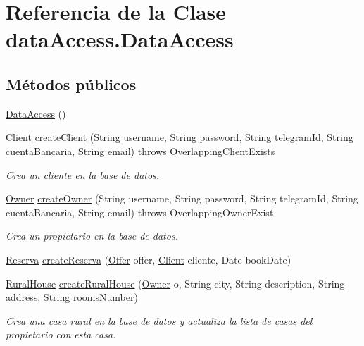 \hypertarget{classdata_access_1_1_data_access}{}\section{Referencia de la Clase data\+Access.\+Data\+Access}
\label{classdata_access_1_1_data_access}
\subsection*{Métodos públicos}
\begin{DoxyCompactItemize}
\item 
\mbox{\hyperlink{classdata_access_1_1_data_access_a4f66a4eefd8656ede2ffc4403af77346}{Data\+Access}} ()
\item 
\mbox{\hyperlink{classdomain_1_1_client}{Client}} \mbox{\hyperlink{classdata_access_1_1_data_access_a660f0677b4ead89efe35c8f8f13c48ec}{create\+Client}} (String username, String password, String telegram\+Id, String cuenta\+Bancaria, String email)  throws Overlapping\+Client\+Exists 
\begin{DoxyCompactList}\small\item\em Crea un cliente en la base de datos. \end{DoxyCompactList}\item 
\mbox{\hyperlink{classdomain_1_1_owner}{Owner}} \mbox{\hyperlink{classdata_access_1_1_data_access_a786f6a4bbd1f36ee68d8cebfd1ebc626}{create\+Owner}} (String username, String password, String telegram\+Id, String cuenta\+Bancaria, String email)  throws Overlapping\+Owner\+Exist 
\begin{DoxyCompactList}\small\item\em Crea un propietario en la base de datos. \end{DoxyCompactList}\item 
\mbox{\hyperlink{classdomain_1_1_reserva}{Reserva}} \mbox{\hyperlink{classdata_access_1_1_data_access_af251e5b2044f3db7d7e9e4ca687808f2}{create\+Reserva}} (\mbox{\hyperlink{classdomain_1_1_offer}{Offer}} offer, \mbox{\hyperlink{classdomain_1_1_client}{Client}} cliente, Date book\+Date)
\item 
\mbox{\hyperlink{classdomain_1_1_rural_house}{Rural\+House}} \mbox{\hyperlink{classdata_access_1_1_data_access_a285dc85c28f00942caf20622fc619541}{create\+Rural\+House}} (\mbox{\hyperlink{classdomain_1_1_owner}{Owner}} o, String city, String description, String address, String rooms\+Number)
\begin{DoxyCompactList}\small\item\em Crea una casa rural en la base de datos y actualiza la lista de casas del propietario con esta casa. \end{DoxyCompactList}\item 

\end{DoxyCompactItemize}
